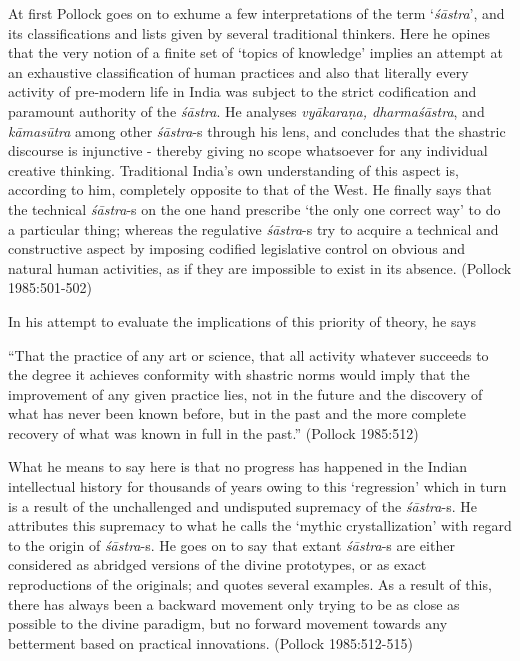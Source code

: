 At first Pollock goes on to exhume a few interpretations of the term `{\it śāstra}', and its classifications and lists given by several traditional thinkers. Here he opines that the very notion of a finite set of `topics of knowledge' implies an attempt at an exhaustive classification of human practices and also that literally every activity of pre-modern life in India was subject to the strict codification and paramount authority of the {\it śāstra}. He analyses \textit{vyākaraṇa, dharmaśāstra}, and {\it kāmasūtra} among other {\it śāstra}-s through his lens, and concludes that the shastric discourse is injunctive - thereby giving no scope whatsoever for any individual creative thinking. Traditional India's own understanding of this aspect is, according to him, completely opposite to that of the West. He finally says that the technical {\it śāstra}-s on the one hand prescribe `the only one correct way' to do a particular thing;  whereas the regulative {\it śāstra}-s try to acquire a technical and constructive aspect by imposing codified legislative control on obvious and natural human activities, as if they are impossible to exist in its absence. (Pollock 1985:501-502)

In his attempt to evaluate the implications of this priority of theory, he says
\begin{myquote}
``That the practice of any art or science, that all activity whatever succeeds to the degree it achieves conformity with shastric norms would imply that the improvement of any given practice lies, not in the future and the discovery of what has never been known before, but in the past and the more complete recovery of what was known in full in the past.'' (Pollock 1985:512)
\end{myquote}

What he means to say here is that no progress has happened in the Indian intellectual history for thousands of years owing to this `regression' which in turn is a result of the unchallenged and undisputed supremacy of the {\it śāstra}-s. He attributes this supremacy to what he calls the `mythic crystallization' with regard to the origin of {\it śāstra}-s. He goes on to say that extant {\it śāstra}-s are either considered as abridged versions of the divine prototypes, or as exact reproductions of the originals; and quotes several examples. As a result of this, there has always been a backward movement only trying to be as close as possible to the divine paradigm, but no forward movement towards any betterment based on practical innovations. (Pollock 1985:512-515)


